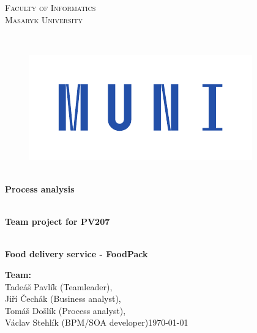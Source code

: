 \documentclass[11pt,a4paper]{article}
\begin{document}
\begin{titlepage}

    \begin{center}
        \vfill {%
            \Huge{%
                \textsc{%
                    Faculty of Informatics\\[3mm]%
                    Masaryk University%
                }%
            }%
        }%

        \hfill\\[15mm]

        \begin{figure}[!h]
            \centering
            \includegraphics[scale=2]{muni-lg-cmyk.pdf}
        \end{figure}

        \hfill\\[10mm]

        \Huge{
            \textbf{
                Process analysis
            }
        }

        \hfill\\[-10mm]

        \huge{
            \textbf{
                Team project for PV207
            }
        }

        \hfill\\[10mm]

        \LARGE{
            \textbf{
                Food delivery service - FoodPack
            }
        }
        \vfill

    \end{center}

        \Large{
            \textbf{Team:}\\Tadeáš Pavlík (Teamleader),\\Jiří Čechák (Business analyst),\\Tomáš Došlík (Process analyst),\\Václav Stehlík (BPM/SOA developer)\hfill \today
        }

\end{titlepage}
\end{document}
